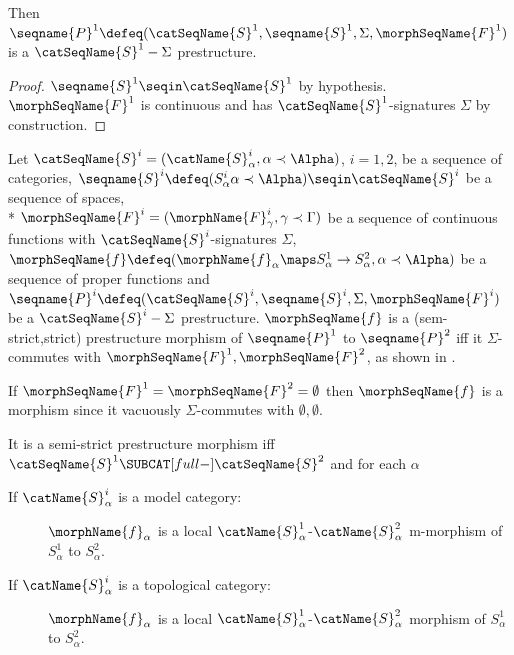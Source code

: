\documentclass{article}
\begin{document}
\begin{lemma}[Prestructures]
Then
$
  \seqname{P}^1 \defeq
  (\catSeqName{S}^1, \seqname{S}^1, \Sigma, \morphSeqName{F}^1)
$
is a $\catSeqName{S}^1-\Sigma$ prestructure.

\begin{proof}
$\seqname{S}^1 \seqin \catSeqName{S}^1$ by hypothesis.
$\morphSeqName{F}^1$ is continuous and has $\catSeqName{S}^1$-signatures
$\Sigma$ by construction.
\end{proof}
\end{lemma}


\begin{definition}
\label{def:premorph}
Let $\catSeqName{S}^i=(\catName{S}^i_\alpha, \alpha \prec \Alpha)$,
$i=1,2$, be a sequence of categories,
$
  \seqname{S}^i \defeq (S^i_\alpha \alpha \prec \Alpha)
  \seqin \catSeqName{S}^i
$
be a sequence of spaces, \\*
$\morphSeqName{F}^i=(\morphName{F}^i_\gamma, \gamma \prec \Gamma)$
be a sequence of continuous functions with
$\catSeqName{S}^i$-signatures $\Sigma$,
$
\morphSeqName{f} \defeq
  (
    \morphName{f}_\alpha \maps S^1_\alpha \to S^2_\alpha,
    \alpha \prec \Alpha
  )
$
be a sequence of proper functions and
$
  \seqname{P}^i \defeq
  (\catSeqName{S}^i, \seqname{S}^i, \Sigma, \morphSeqName{F}^i)
$
be a $\catSeqName{S}^i-\Sigma$ prestructure. $\morphSeqName{f}$ is a
(sem-strict,strict) prestructure morphism of
$\seqname{P}^1$ to $\seqname{P}^2$ iff it $\Sigma$-commutes with
$\morphSeqName{F}^1,\morphSeqName{F}^2$, as shown in
.

\begin{remark}
If $\morphSeqName{F}^1 = \morphSeqName{F}^2 = \emptyset$ then
$\morphSeqName{f}$ is a morphism since it vacuously $\Sigma$-commutes
with $\emptyset,\emptyset$.
\end{remark}

It is a semi-strict prestructure morphism iff
$\catSeqName{S}^1 \SUBCAT[full-] \catSeqName{S}^2$ and for each $\alpha$

\begin{description}
\item[If $\catName{S}^i_\alpha$ is a model category:]
$\morphName{f}_\alpha$ is a local
$\catName{S}^1_\alpha$-$\catName{S}^2_\alpha$ m-morphism of $S^1_\alpha$
to $S^2_\alpha$.

\item[If $\catName{S}^i_\alpha$ is a topological category:]
$\morphName{f}_\alpha$ is a local
$\catName{S}^1_\alpha$-$\catName{S}^2_\alpha$ morphism of $S^1_\alpha$
to $S^2_\alpha$.


\end{description}
\end{definition}
\end{document}
